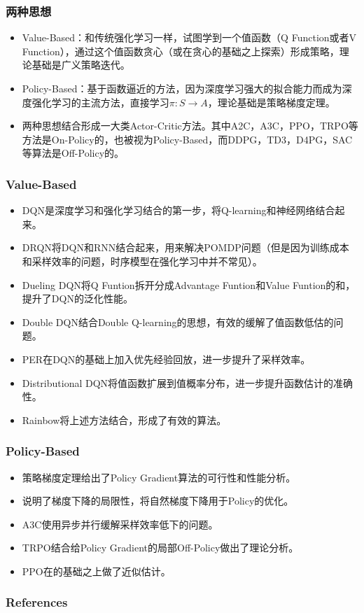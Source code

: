 \documentclass[aspectratio=169]{beamer}
\begin{document}
\begin{frame}
  \frametitle{两种思想}
  \begin{itemize}
    \item Value-Based：和传统强化学习一样，试图学到一个值函数（Q Function或者V Function），通过这个值函数贪心（或在贪心的基础之上探索）形成策略，理论基础是广义策略迭代。
    \item Policy-Based：基于函数逼近的方法，因为深度学习强大的拟合能力而成为深度强化学习的主流方法，直接学习$\pi:S \rightarrow A$，理论基础是策略梯度定理。
    \item 两种思想结合形成一大类Actor-Critic方法。其中A2C，A3C，PPO，TRPO等方法是On-Policy的，也被视为Policy-Based，而DDPG，TD3，D4PG，SAC等算法是Off-Policy的。
  \end{itemize}
\end{frame}

\begin{frame}
  \frametitle{Value-Based}
  \begin{itemize}
    \item DQN\cite{mnih2015human}是深度学习和强化学习结合的第一步，将Q-learning\cite{watkins1992q}和神经网络结合起来。
    \item DRQN\cite{hausknecht2015deep}将DQN和RNN结合起来，用来解决POMDP问题（但是因为训练成本和采样效率的问题，时序模型在强化学习中并不常见）。
    \item Dueling DQN\cite{wang2016dueling}将Q Funtion拆开分成Advantage Funtion和Value Funtion的和，提升了DQN的泛化性能。
    \item Double DQN\cite{van2015deep}结合Double Q-learning\cite{hasselt2010double}的思想，有效的缓解了值函数低估的问题。
    \item PER\cite{schaul2015prioritized}在DQN的基础上加入优先经验回放，进一步提升了采样效率。
    \item Distributional DQN\cite{dabney2017distributional}\cite{dabney2018implicit}\cite{bellemare2017distributional}将值函数扩展到值概率分布，进一步提升函数估计的准确性。
    \item Rainbow\cite{hessel2017rainbow}将上述方法结合，形成了有效的算法。
  \end{itemize}
\end{frame}

\begin{frame}
  \frametitle{Policy-Based}
  \begin{itemize}
    \item 策略梯度定理\cite{sutton1999policy}给出了Policy Gradient算法的可行性和性能分析。
    \item \cite{kakade2001natural}说明了梯度下降的局限性，将自然梯度下降用于Policy的优化。
    \item A3C\cite{mnih2016asynchronous}使用异步并行缓解采样效率低下的问题。
    \item TRPO\cite{schulman2015trust}结合\cite{kakade2001natural}给Policy Gradient的局部Off-Policy做出了理论分析。
    \item PPO\cite{schulman2017proximal}在\cite{schulman2015trust}的基础之上做了近似估计。
  \end{itemize}
\end{frame}

\begin{frame}[allowframebreaks]
\frametitle{References}
\printbibliography
\end{frame}
\end{document}
